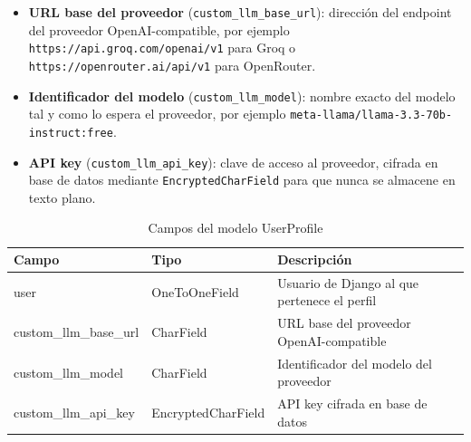 \begin{itemize}
    \item \textbf{URL base del proveedor} (\texttt{custom\_llm\_base\_url}): 
    dirección del endpoint del proveedor OpenAI-compatible, por ejemplo 
    \texttt{https://api.groq.com/openai/v1} para Groq o 
    \texttt{https://openrouter.ai/api/v1} para OpenRouter.
    
    \item \textbf{Identificador del modelo} (\texttt{custom\_llm\_model}): 
    nombre exacto del modelo tal y como lo espera el proveedor, por ejemplo 
    \texttt{meta-llama/llama-3.3-70b-instruct:free}.
    
    \item \textbf{API key} (\texttt{custom\_llm\_api\_key}): clave de acceso 
    al proveedor, cifrada en base de datos mediante \texttt{EncryptedCharField} 
    para que nunca se almacene en texto plano.
\end{itemize}

\begin{table}[H]
    \centering
    \begin{tabular}{|l|l|p{8cm}|}
        \hline
        \textbf{Campo} & \textbf{Tipo} & \textbf{Descripción} \\
        \hline
        user & OneToOneField & Usuario de Django al que pertenece el perfil \\
        \hline
        custom\_llm\_base\_url & CharField & URL base del proveedor OpenAI-compatible \\
        \hline
        custom\_llm\_model & CharField & Identificador del modelo del proveedor \\
        \hline
        custom\_llm\_api\_key & EncryptedCharField & API key cifrada en base de datos \\
        \hline
    \end{tabular}
    \caption{Campos del modelo UserProfile}
    \label{tab:modelo-userprofile}
\end{table}


